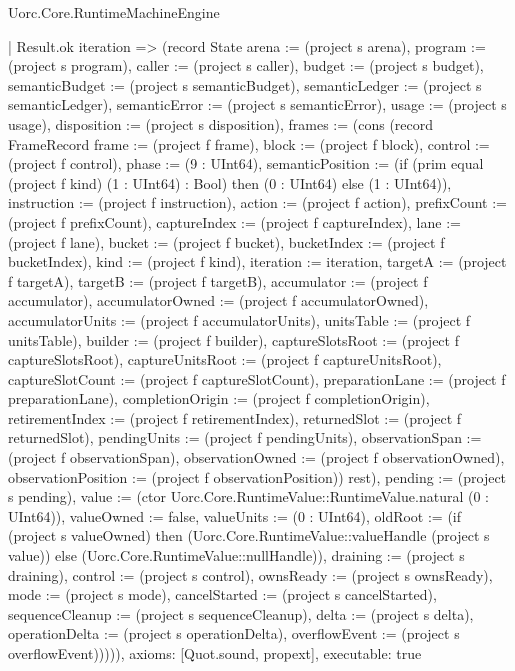 \begin{lexlean}{Uorc.Core.RuntimeMachineEngine}
\begin{semanticmodule}
{      | Result.ok iteration => (record State {arena := (project s arena), program := (project s program), caller := (project s caller), budget := (project s budget), semanticBudget := (project s semanticBudget), semanticLedger := (project s semanticLedger), semanticError := (project s semanticError), usage := (project s usage), disposition := (project s disposition), frames := (cons (record FrameRecord {frame := (project f frame), block := (project f block), control := (project f control), phase := (9 : UInt64), semanticPosition := (if (prim equal (project f kind) (1 : UInt64) : Bool) then (0 : UInt64) else (1 : UInt64)), instruction := (project f instruction), action := (project f action), prefixCount := (project f prefixCount), captureIndex := (project f captureIndex), lane := (project f lane), bucket := (project f bucket), bucketIndex := (project f bucketIndex), kind := (project f kind), iteration := iteration, targetA := (project f targetA), targetB := (project f targetB), accumulator := (project f accumulator), accumulatorOwned := (project f accumulatorOwned), accumulatorUnits := (project f accumulatorUnits), unitsTable := (project f unitsTable), builder := (project f builder), captureSlotsRoot := (project f captureSlotsRoot), captureUnitsRoot := (project f captureUnitsRoot), captureSlotCount := (project f captureSlotCount), preparationLane := (project f preparationLane), completionOrigin := (project f completionOrigin), retirementIndex := (project f retirementIndex), returnedSlot := (project f returnedSlot), pendingUnits := (project f pendingUnits), observationSpan := (project f observationSpan), observationOwned := (project f observationOwned), observationPosition := (project f observationPosition)}) rest), pending := (project s pending), value := (ctor Uorc.Core.RuntimeValue::RuntimeValue.natural (0 : UInt64)), valueOwned := false, valueUnits := (0 : UInt64), oldRoot := (if (project s valueOwned) then (Uorc.Core.RuntimeValue::valueHandle (project s value)) else (Uorc.Core.RuntimeValue::nullHandle)), draining := (project s draining), control := (project s control), ownsReady := (project s ownsReady), mode := (project s mode), cancelStarted := (project s cancelStarted), sequenceCleanup := (project s sequenceCleanup), delta := (project s delta), operationDelta := (project s operationDelta), overflowEvent := (project s overflowEvent)})))),
  axioms: [Quot.sound, propext],
  executable: true
}


\end{semanticmodule}
\end{lexlean}
